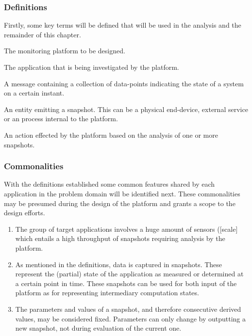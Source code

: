 \subsubsection*{Definitions}
Firstly, some key terms will be defined that will be used in the analysis and the remainder of this chapter.
\begin{description}[style=nextline]
\nospace
\item[Platform] The monitoring platform to be designed.
\item[Application] The application that is being investigated by the platform.
\item[Snapshot] A message containing a collection of data-points indicating the state of a system on a certain instant.
\item[Source] An entity emitting a snapshot. This can be a physical end-device, external service or an process internal to the platform.
\item[Consequence] An action effected by the platform based on the analysis of one or more snapshots.
\end{description}
\subsubsection*{Commonalities}
With the definitions established some common features shared by each application in the problem domain will be identified next. These commonalities may be presumed during the design of the platform and grants a scope to the design efforts.
\begin{enumerate}[label=C\archid .\arabic*]
\nospace
\item \label{c:scale_sensor} The group of target applications involves a huge amount of sensors ([scale] which entails a high throughput of snapshots requiring analysis by the platform.
\item \label{c:snapshot} As mentioned in the definitions, data is captured in snapshots. These represent the (partial) state of the application as measured or determined at a certain point in time. These snapshots can be used for both input of the platform as for representing intermediary computation states.
\item \label{c:snapshot_transformation} The parameters and values of a snapshot, and therefore consecutive derived values, may be considered fixed. Parameters can only change by outputting a new snapshot, not during evaluation of the current one.
\end{enumerate}
